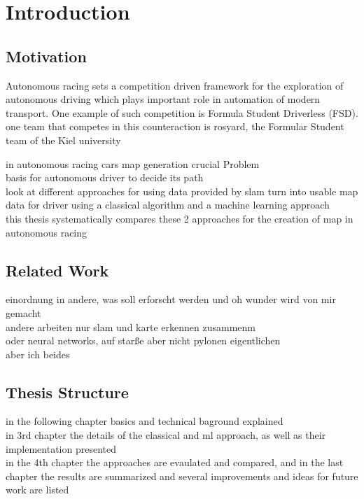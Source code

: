 \chapter{Introduction}

\section{Motivation}



Autonomous racing sets a competition driven framework for the exploration of autonomous driving
which plays important role in automation of modern transport. One example of such competition is
Formula Student Driverless (FSD).
one team that competes in this counteraction is rosyard, the Formular Student team of the Kiel university

in autonomous racing
cars map generation crucial Problem\\
basis for autonomous driver to decide its path\\
look at different approaches for using data provided by \ac{slam} turn into usable map data for driver
using a classical algorithm and a machine learning approach\\
this thesis systematically compares these 2 approaches for the creation of map in autonomous racing
\section{Related Work}

einordnung in andere, was soll erforscht werden und oh wunder wird von mir gemacht\\

andere arbeiten nur slam und karte erkennen zusammenm\\
oder neural networks, auf starße aber nicht pylonen eigentlichen\\
aber ich beides

\section{Thesis Structure}
in the following chapter basics and technical baground explained\\
in 3rd chapter the details of the classical and \ac{ml} approach, as well as their implementation presented\\
in the 4th chapter the approaches are evaulated and compared,
and in the last chapter the results are summarized and several improvements and ideas for future work are listed

